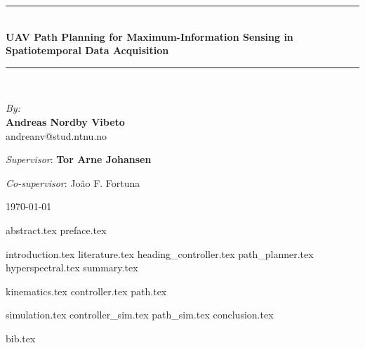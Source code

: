 \documentclass{article}
\newcommand{\HRule}{\rule{\linewidth}{0.5mm}}
\numberwithin{equation}{section}
\begin{document}
\begin{center}
\HRule \\[0.4cm]
{ \huge \bfseries UAV Path Planning for Maximum-Information Sensing in Spatiotemporal Data Acquisition}
\HRule \\[1.5cm]

\begin{center} \large
\emph{By:}\\
\textbf{Andreas Nordby Vibeto}\\
andreanv@stud.ntnu.no
\end{center}

\begin{center}\large
\emph{Supervisor}: \textbf{Tor Arne Johansen}
\end{center}
\begin{center}
\emph{Co-supervisor}: João F. Fortuna
\end{center}

\vfill

\begin{figure}[!h]
    \centering
\end{figure}

\vfill

{\large \monthyear\today}

\end{center}
\newpage

{abstract.tex}
\newpage
{preface.tex}
\newpage

\tableofcontents

\newpage

\pagestyle{fancy}
{introduction.tex}
\newpage
{literature.tex}
{heading_controller.tex}
{path_planner.tex}
{hyperspectral.tex}
{summary.tex}

\newpage
{kinematics.tex}
\newpage
{controller.tex}
\newpage
{path.tex}
\clearpage

{simulation.tex}
\clearpage
{controller_sim.tex}
\clearpage
{path_sim.tex}
\newpage
{conclusion.tex}

\newpage
{bib.tex}
\end{document}
